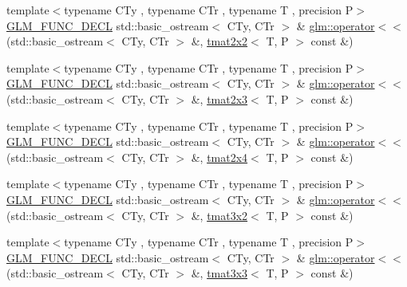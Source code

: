 \begin{DoxyCompactItemize}
\item 
{\footnotesize template$<$typename C\+Ty , typename C\+Tr , typename T , precision P$>$ }\\\mbox{\hyperlink{setup_8hpp_ab2d052de21a70539923e9bcbf6e83a51}{G\+L\+M\+\_\+\+F\+U\+N\+C\+\_\+\+D\+E\+CL}} std\+::basic\+\_\+ostream$<$ C\+Ty, C\+Tr $>$ \& \mbox{\hyperlink{group__gtx__io_ga61fbdb6ad70c4c8d750a847251fa4a4a}{glm\+::operator$<$$<$}} (std\+::basic\+\_\+ostream$<$ C\+Ty, C\+Tr $>$ \&, \mbox{\hyperlink{structglm_1_1tmat2x2}{tmat2x2}}$<$ T, P $>$ const \&)
\item 
{\footnotesize template$<$typename C\+Ty , typename C\+Tr , typename T , precision P$>$ }\\\mbox{\hyperlink{setup_8hpp_ab2d052de21a70539923e9bcbf6e83a51}{G\+L\+M\+\_\+\+F\+U\+N\+C\+\_\+\+D\+E\+CL}} std\+::basic\+\_\+ostream$<$ C\+Ty, C\+Tr $>$ \& \mbox{\hyperlink{group__gtx__io_ga032043616f87c7eefaf4d83a20f779a5}{glm\+::operator$<$$<$}} (std\+::basic\+\_\+ostream$<$ C\+Ty, C\+Tr $>$ \&, \mbox{\hyperlink{structglm_1_1tmat2x3}{tmat2x3}}$<$ T, P $>$ const \&)
\item 
{\footnotesize template$<$typename C\+Ty , typename C\+Tr , typename T , precision P$>$ }\\\mbox{\hyperlink{setup_8hpp_ab2d052de21a70539923e9bcbf6e83a51}{G\+L\+M\+\_\+\+F\+U\+N\+C\+\_\+\+D\+E\+CL}} std\+::basic\+\_\+ostream$<$ C\+Ty, C\+Tr $>$ \& \mbox{\hyperlink{group__gtx__io_ga1a2314cab31da0e736bc5e601bcb8f37}{glm\+::operator$<$$<$}} (std\+::basic\+\_\+ostream$<$ C\+Ty, C\+Tr $>$ \&, \mbox{\hyperlink{structglm_1_1tmat2x4}{tmat2x4}}$<$ T, P $>$ const \&)
\item 
{\footnotesize template$<$typename C\+Ty , typename C\+Tr , typename T , precision P$>$ }\\\mbox{\hyperlink{setup_8hpp_ab2d052de21a70539923e9bcbf6e83a51}{G\+L\+M\+\_\+\+F\+U\+N\+C\+\_\+\+D\+E\+CL}} std\+::basic\+\_\+ostream$<$ C\+Ty, C\+Tr $>$ \& \mbox{\hyperlink{group__gtx__io_gac825ec168ada9209dad314bca460ceef}{glm\+::operator$<$$<$}} (std\+::basic\+\_\+ostream$<$ C\+Ty, C\+Tr $>$ \&, \mbox{\hyperlink{structglm_1_1tmat3x2}{tmat3x2}}$<$ T, P $>$ const \&)
\item 
{\footnotesize template$<$typename C\+Ty , typename C\+Tr , typename T , precision P$>$ }\\\mbox{\hyperlink{setup_8hpp_ab2d052de21a70539923e9bcbf6e83a51}{G\+L\+M\+\_\+\+F\+U\+N\+C\+\_\+\+D\+E\+CL}} std\+::basic\+\_\+ostream$<$ C\+Ty, C\+Tr $>$ \& \mbox{\hyperlink{group__gtx__io_ga3ea3ca90bea2e763079f09af1e5d50ab}{glm\+::operator$<$$<$}} (std\+::basic\+\_\+ostream$<$ C\+Ty, C\+Tr $>$ \&, \mbox{\hyperlink{structglm_1_1tmat3x3}{tmat3x3}}$<$ T, P $>$ const \&)

\end{DoxyCompactItemize}
